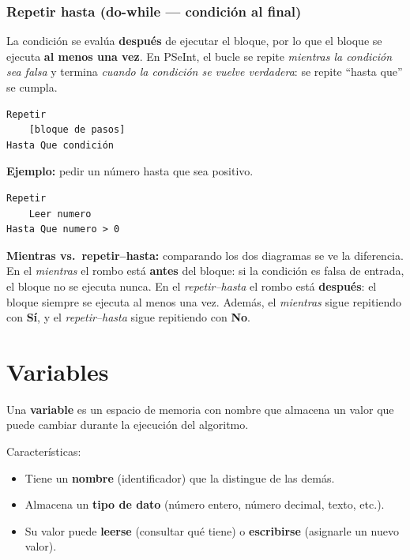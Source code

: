 \subsubsection{Repetir hasta (do-while --- condición al final)}

La condición se evalúa \textbf{después} de ejecutar el bloque, por lo que el bloque se ejecuta \textbf{al menos una vez}. En PSeInt, el bucle se repite \emph{mientras la condición sea falsa} y termina \emph{cuando la condición se vuelve verdadera}: se repite ``hasta que'' se cumpla.


\begin{lstlisting}[style=estilo-pseudocode]
Repetir
    [bloque de pasos]
Hasta Que condición
\end{lstlisting}

\textbf{Ejemplo:} pedir un número hasta que sea positivo.
\begin{lstlisting}[style=estilo-pseudocode]
Repetir
    Leer numero
Hasta Que numero > 0
\end{lstlisting}

\begin{notabox}
\textbf{Mientras vs.\ repetir--hasta:} comparando los dos diagramas se ve la diferencia. En el \emph{mientras} el rombo está \textbf{antes} del bloque: si la condición es falsa de entrada, el bloque no se ejecuta nunca. En el \emph{repetir--hasta} el rombo está \textbf{después}: el bloque siempre se ejecuta al menos una vez. Además, el \emph{mientras} sigue repitiendo con \textbf{Sí}, y el \emph{repetir--hasta} sigue repitiendo con \textbf{No}.
\end{notabox}

\section{Variables}

Una \textbf{variable} es un espacio de memoria con nombre que almacena un valor que puede cambiar durante la ejecución del algoritmo.

Características:
\begin{itemize}
    \item Tiene un \textbf{nombre} (identificador) que la distingue de las demás.
    \item Almacena un \textbf{tipo de dato} (número entero, número decimal, texto, etc.).
    \item Su valor puede \textbf{leerse} (consultar qué tiene) o \textbf{escribirse} (asignarle un nuevo valor).
\end{itemize}

